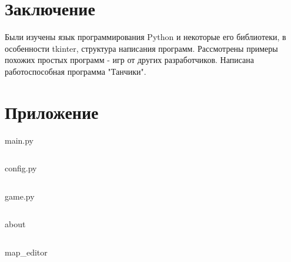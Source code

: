 \documentclass[14pt, oneside]{altsu-report}
\begin{document}
\chapter*{Заключение}

Были изучены язык программирования Python и некоторые его библиотеки, в особенности tkinter, структура написания программ. Рассмотрены примеры похожих простых программ - игр от других разработчиков. Написана работоспособная программа "Танчики".

\newpage
{}
\printbibliography[title={Список использованных источников}]

\appendix
\newpage
\chapter*{\raggedleft\label{appendix1}Приложение}

\begin{center}
\label{code:appendix}main.py
\end{center}

\begin{code}
\vspace{-1cm}\inputminted{Python}{src/main.py}
\end{code}

\newpage

\begin{center}
\label{code:appendix}config.py
\end{center}

\begin{code}
\vspace{-1cm}\inputminted{Python}{src/config.py}
\end{code}

\begin{center}
\label{code:appendix}game.py
\end{center}

\begin{code}
\vspace{-1cm}\inputminted{Python}{src/game.py}
\end{code}

\begin{center}
\label{code:appendix}about
\end{center}

\begin{code}
\vspace{-1cm}\inputminted{Python}{src/about.py}
\end{code}

\begin{center}
\label{code:appendix}map\_editor
\end{center}

\begin{code}
\vspace{-1cm}\inputminted{Python}{src/map_editor.py}
\end{code}
\end{document}
